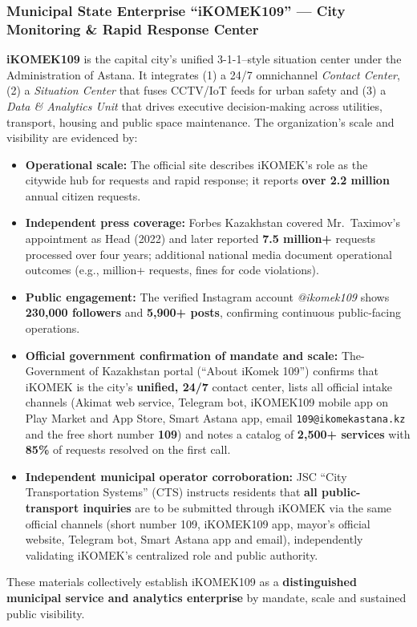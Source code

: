 \subsubsection{Municipal State Enterprise “iKOMEK109” — City Monitoring \& Rapid Response Center}
\label{subsubsec:RoleIKomek}

\textbf{iKOMEK109} is the capital city’s unified 3-1-1–style situation center under the Administration of Astana. It integrates (1) a 24/7 omnichannel \emph{Contact Center}, (2) a \emph{Situation Center} that fuses CCTV/IoT feeds for urban safety and (3) a \emph{Data \& Analytics Unit} that drives executive decision-making across utilities, transport, housing and public space maintenance. The organization’s scale and visibility are evidenced by:
\vspace{-0.5\baselineskip}
\begin{itemize}[nosep]
  \item \textbf{Operational scale:} The official site describes iKOMEK’s role as the citywide hub for requests and rapid response; it reports \textbf{over 2.2 million} annual citizen requests. 
  \item \textbf{Independent press coverage:} Forbes Kazakhstan covered Mr.\ Taximov’s appointment as Head (2022) and later reported \textbf{7.5 million+} requests processed over four years; additional national media document operational outcomes (e.g., million+ requests, fines for code violations). 
  \item \textbf{Public engagement:} The verified Instagram account \emph{@ikomek109} shows \textbf{230{,}000 followers} and \textbf{5{,}900+ posts}, confirming continuous public-facing operations. 
  \item \textbf{Official government confirmation of mandate and scale:} The-Government of Kazakhstan portal (“About iKomek 109”) confirms that iKOMEK is the city’s \textbf{unified, 24/7} contact center, lists all official intake channels (Akimat web service, Telegram bot, iKOMEK109 mobile app on Play Market and App Store, Smart Astana app, email \texttt{109@ikomekastana.kz} and the free short number \textbf{109}) and notes a catalog of \textbf{2{,}500+ services} with \textbf{85\%} of requests resolved on the first call. 
  \item \textbf{Independent municipal operator corroboration:} JSC “City Transportation Systems” (CTS) instructs residents that \textbf{all public-transport inquiries} are to be submitted through iKOMEK via the same official channels (short number 109, iKOMEK109 app, mayor’s official website, Telegram bot, Smart Astana app and email), independently validating iKOMEK’s centralized role and public authority. 
\end{itemize}
These materials collectively establish iKOMEK109 as a \textbf{distinguished municipal service and analytics enterprise} by mandate, scale and sustained public visibility. 

